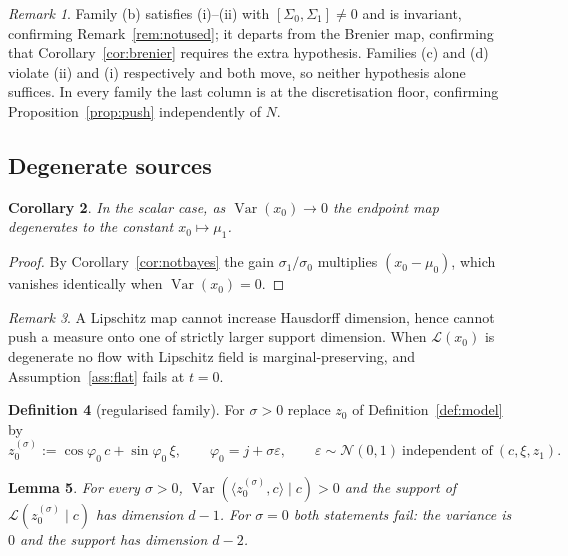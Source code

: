 \documentclass[11pt]{article}
\newtheorem{lemma}{Lemma}[section]
\newtheorem{corollary}[lemma]{Corollary}
\theoremstyle{definition}
\newtheorem{definition}[lemma]{Definition}
\theoremstyle{remark}
\newtheorem{remark}[lemma]{Remark}
\DeclareMathOperator{\Var}{Var}
\newcommand{\law}{\mathcal{L}}
\begin{document}
\begin{remark}\label{rem:armsread}
Family (b) satisfies (i)--(ii) with $[\Sigma_0,\Sigma_1]\neq0$ and is invariant, confirming
Remark~\ref{rem:notused}; it departs from the Brenier map, confirming that
Corollary~\ref{cor:brenier} requires the extra hypothesis. Families (c) and (d) violate (ii) and
(i) respectively and both move, so neither hypothesis alone suffices. In every family the last
column is at the discretisation floor, confirming Proposition~\ref{prop:push} independently of
$N$.
\end{remark}

\subsection{Degenerate sources}

\begin{corollary}\label{cor:degen}
In the scalar case, as $\Var(x_0)\to0$ the endpoint map degenerates to the constant
$x_0\mapsto\mu_1$.
\end{corollary}

\begin{proof}
By Corollary~\ref{cor:notbayes} the gain $\sigma_1/\sigma_0$ multiplies $(x_0-\mu_0)$, which
vanishes identically when $\Var(x_0)=0$.
\end{proof}

\begin{remark}\label{rem:degenmech}
A Lipschitz map cannot increase Hausdorff dimension, hence cannot push a measure onto one of
strictly larger support dimension. When $\law(x_0)$ is degenerate no flow with Lipschitz field is
marginal-preserving, and Assumption~\ref{ass:flat} fails at $t=0$.
\end{remark}

\begin{definition}[regularised family]\label{def:sigfam}
For $\sigma>0$ replace $z_0$ of Definition~\ref{def:model} by
\[
z_0^{(\sigma)}:=\cos\varphi_0\,c+\sin\varphi_0\,\xi,
\qquad
\varphi_0=j+\sigma\varepsilon,
\qquad
\varepsilon\sim\mathcal N(0,1)\ \text{independent of}\ (c,\xi,z_1).
\]
\end{definition}

\begin{lemma}\label{lem:sigrank}
For every $\sigma>0$, $\Var(\langle z_0^{(\sigma)},c\rangle\mid c)>0$ and the support of
$\law(z_0^{(\sigma)}\mid c)$ has dimension $d-1$. For $\sigma=0$ both statements fail: the variance
is $0$ and the support has dimension $d-2$.
\end{lemma}
\end{document}
